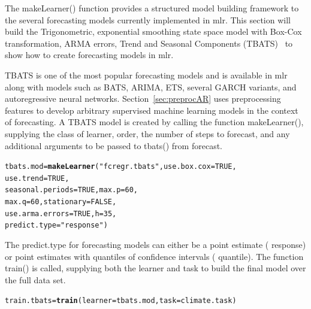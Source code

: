 \documentclass[12pt]{article}\usepackage[]{graphicx}\usepackage[]{color}
\makeatletter
\newcommand{\hlnum}[1]{\textcolor[rgb]{0.686,0.059,0.569}{#1}}%
\newcommand{\hlstr}[1]{\textcolor[rgb]{0.192,0.494,0.8}{#1}}%
\newcommand{\hlstd}[1]{\textcolor[rgb]{0.345,0.345,0.345}{#1}}%
\newcommand{\hlkwb}[1]{\textcolor[rgb]{0.69,0.353,0.396}{#1}}%
\newcommand{\hlkwc}[1]{\textcolor[rgb]{0.333,0.667,0.333}{#1}}%
\newcommand{\hlkwd}[1]{\textcolor[rgb]{0.737,0.353,0.396}{\textbf{#1}}}%
\newenvironment{kframe}{%
 \def\at@end@of@kframe{}%
 \ifinner\ifhmode%
  \def\at@end@of@kframe{\end{minipage}}%
  \begin{minipage}{\columnwidth}%
 \fi\fi%
 \def\FrameCommand##1{\hskip\@totalleftmargin \hskip-\fboxsep
 \colorbox{shadecolor}{##1}\hskip-\fboxsep
     \hskip-\linewidth \hskip-\@totalleftmargin \hskip\columnwidth}%
 \MakeFramed {\advance\hsize-\width
   \@totalleftmargin\z@ \linewidth\hsize
   \@setminipage}}%
 {\par\unskip\endMakeFramed%
 \at@end@of@kframe}
\newenvironment{knitrout}{}{} %
\theoremstyle{definition}
\newcommand\code{\@codex}
\def\@codex#1{{\normalfont\ttfamily\hyphenchar\font=-1 #1}}
\newcommand{\pkg}[1]{{\fontseries{b}\selectfont #1}}
\makeatother
\begin{document}
The \code{makeLearner()} function provides a structured model building framework to the several forecasting models currently implemented in \pkg{mlr}. This section will build the Trigonometric, exponential smoothing state space model with Box-Cox transformation, ARMA errors, Trend and Seasonal Components (TBATS)~\cite{tbats} to show how to create forecasting models in \pkg{mlr}.

TBATS is one of the most popular forecasting models and is available in \pkg{mlr} along with models such as BATS, ARIMA, ETS, several GARCH variants, and autoregressive neural networks. Section~\ref{sec:preprocAR} uses preprocessing features to develop arbitrary supervised machine learning models in the context of forecasting. A TBATS model is created by calling the function \code{makeLearner()}, supplying the class of learner, order, the number of steps to forecast, and any additional arguments to be passed to \code{tbats()} from \pkg{forecast}. 

\singlespacing
\begin{knitrout}
\color{fgcolor}\begin{kframe}
\begin{alltt}
\hlstd{tbats.mod} \hlkwb{=}\hlkwd{makeLearner}\hlstd{(}\hlstr{"fcregr.tbats"}\hlstd{,} \hlkwc{use.box.cox} \hlstd{=} \hlnum{TRUE}\hlstd{,}
                      \hlkwc{use.trend} \hlstd{=} \hlnum{TRUE}\hlstd{,}
                      \hlkwc{seasonal.periods} \hlstd{=} \hlnum{TRUE}\hlstd{,} \hlkwc{max.p} \hlstd{=} \hlnum{60}\hlstd{,}
                      \hlkwc{max.q} \hlstd{=} \hlnum{60}\hlstd{,} \hlkwc{stationary} \hlstd{=} \hlnum{FALSE}\hlstd{,}
                      \hlkwc{use.arma.errors} \hlstd{=} \hlnum{TRUE}\hlstd{,} \hlkwc{h} \hlstd{=} \hlnum{35}\hlstd{,}
                      \hlkwc{predict.type} \hlstd{=} \hlstr{"response"}\hlstd{)}
\end{alltt}
\end{kframe}
\end{knitrout}
\doublespacing

The \code{predict.type} for forecasting models can either be a point estimate (\code{response}) or point estimates with quantiles of confidence intervals (\code{quantile}). The function \code{train()} is called, supplying both the learner and task to build the final model over the full data set.

\singlespace
\begin{knitrout}
\color{fgcolor}\begin{kframe}
\begin{alltt}
\hlstd{train.tbats}\hlkwb{=} \hlkwd{train}\hlstd{(}\hlkwc{learner} \hlstd{= tbats.mod,} \hlkwc{task} \hlstd{= climate.task )}
\end{alltt}
\end{kframe}
\end{knitrout}
\doublespace
\end{document}
